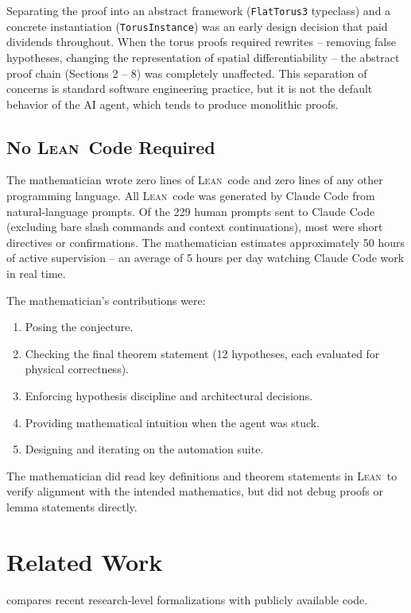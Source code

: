 \documentclass[11pt]{article}
\newcommand{\lean}{\textsc{Lean}}
\begin{document}
Separating the proof into an abstract framework (\texttt{FlatTorus3} typeclass) and a concrete instantiation (\texttt{TorusInstance}) was an early design decision that paid dividends throughout. When the torus proofs required rewrites -- removing false hypotheses, changing the representation of spatial differentiability -- the abstract proof chain (Sections 2 -- 8) was completely unaffected. This separation of concerns is standard software engineering practice, but it is not the default behavior of the AI agent, which tends to produce monolithic proofs.

\subsection{No \lean\ Code Required}

The mathematician wrote zero lines of \lean\ code and zero lines of any other programming language. All \lean\ code was generated by Claude Code from natural-language prompts. Of the 229 human prompts sent to Claude Code (excluding bare slash commands and context continuations), most were short directives or confirmations. The mathematician estimates approximately 50 hours of active supervision -- an average of 5 hours per day watching Claude Code work in real time.

The mathematician's contributions were:
\begin{enumerate}[leftmargin=2em]
  \item Posing the conjecture.
  \item Checking the final theorem statement (12 hypotheses, each evaluated for physical correctness).
  \item Enforcing hypothesis discipline and architectural decisions.
  \item Providing mathematical intuition when the agent was stuck.
  \item Designing and iterating on the automation suite.
\end{enumerate}

The mathematician did read key definitions and theorem statements in \lean\ to verify alignment with the intended mathematics, but did not debug proofs or lemma statements directly.

\section{Related Work}
\label{sec:related}

 compares recent research-level formalizations with publicly available code.
\end{document}
